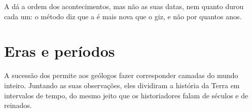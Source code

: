 A  dá a ordem dos acontecimentos, mas não as suas datas,
nem quanto durou cada um: o método diz que a  é mais nova que o giz,
e não por quantos anos.

\section{Eras e períodos}

A sucessão dos  permite aos geólogos fazer corresponder camadas do
mundo inteiro. Juntando as suas observações, eles dividiram a história da
Terra em intervalos de tempo, do mesmo jeito que os historiadores falam
de séculos e de reinados.

